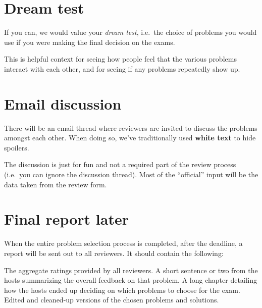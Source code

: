 \section{Dream test}
If you can, we would value your \emph{dream test},
i.e.\ the choice of problems you would use
if you were making the final decision on the exams.

This is helpful context for seeing how people
feel that the various problems interact with each other,
and for seeing if any problems repeatedly show up.

\section{Email discussion}
There will be an email thread where reviewers
are invited to discuss the problems amongst each other.
When doing so, we've traditionally used \textbf{white text}
to hide spoilers.

The discussion is just for fun and not a required part
of the review process (i.e.\ you can ignore the discussion thread).
Most of the ``official'' input will be the data
taken from the review form.

\section{Final report later}
When the entire problem selection process is completed,
after the deadline, a report will be sent out to all reviewers.
It should contain the following:
\begin{itemize}
  \ii The aggregate ratings provided by all reviewers.
  \ii A short sentence or two from the hosts
  summarizing the overall feedback on that problem.
  \ii A long chapter detailing how the hosts ended up
  deciding on which problems to choose for the exam.
  \ii Edited and cleaned-up versions of the
  chosen problems and solutions.
\end{itemize}
